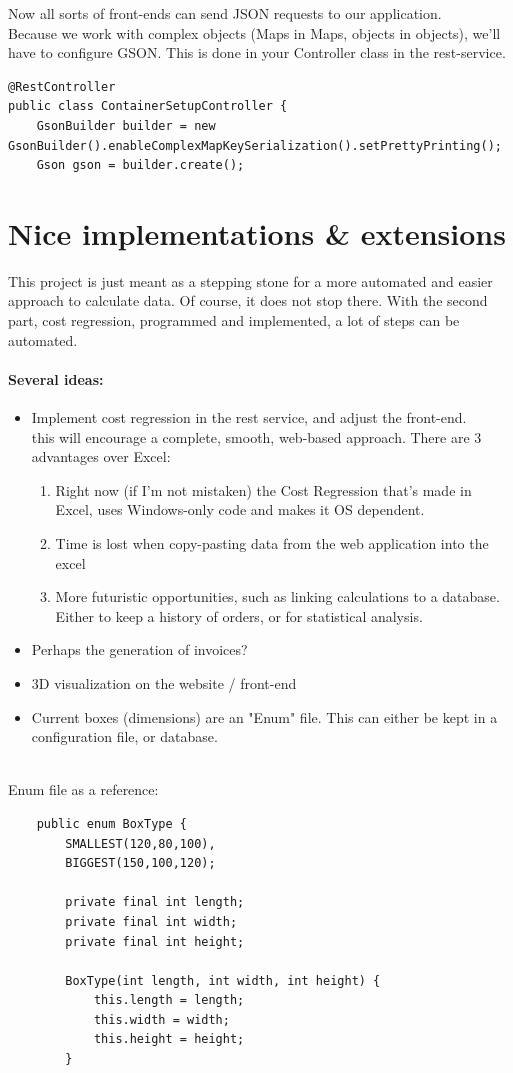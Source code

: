 \documentclass[a4paper,12pt]{article}
\begin{document}
Now all sorts of front-ends can send JSON requests to our application. \\

Because we work with complex objects (Maps in Maps, objects in objects), we'll have to configure GSON. This is done in your Controller class in the rest-service.
\begin{lstlisting}
@RestController
public class ContainerSetupController {
	GsonBuilder builder = new GsonBuilder().enableComplexMapKeySerialization().setPrettyPrinting();
	Gson gson = builder.create();
\end{lstlisting}

\pagebreak

\section{Nice implementations \& extensions }
This project is just meant as a stepping stone for a more automated and easier approach to calculate data. Of course, it does not stop there. With the second part, cost regression, programmed and implemented, a lot of steps can be automated. \\

\paragraph{Several ideas:}
\begin{itemize}
	\item Implement cost regression in the rest service, and adjust the front-end. \\
	this will encourage a complete, smooth, web-based approach. There are 3 advantages over Excel:
	\begin{enumerate}
		\item Right now (if I'm not mistaken) the Cost Regression that's made in Excel, uses Windows-only code and makes it OS dependent.
		\item Time is lost when copy-pasting data from the web application into the excel
		\item More futuristic opportunities, such as linking calculations to a database. Either to keep a history of orders, or for statistical analysis.
	\end{enumerate}
	\item Perhaps the generation of invoices?
	\item 3D visualization on the website / front-end
	\item Current boxes (dimensions) are an "Enum" file. This can either be kept in a configuration file, or database. \\ \\
\end{itemize}

Enum file as a reference:
\begin{lstlisting}
	public enum BoxType {
		SMALLEST(120,80,100),
		BIGGEST(150,100,120);
		
		private final int length;
		private final int width;
		private final int height;
		
		BoxType(int length, int width, int height) {
			this.length = length;
			this.width = width;
			this.height = height;
		}
\end{lstlisting}
\end{document}

